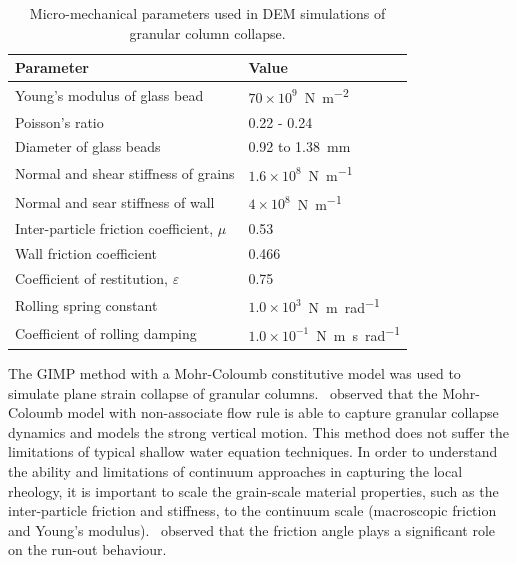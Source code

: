\begin{table}
\caption{Micro-mechanical parameters used in DEM simulations of granular column 
collapse.}
\label{table:DEM_data}
\centering
\begin{tabular}{ll}
\toprule
\textbf{Parameter} & \textbf{Value} \\ \midrule
Young's modulus of glass bead & 
$70\times10^{9}$~\si{\newton\per\m\squared}\\ 
Poisson's ratio & 0.22 - 0.24\\ 
Diameter of glass beads & 0.92 to 1.38~\si{\mm}\\
Normal and shear stiffness of grains & $1.6 \times 
10^{8}$~\si{\newton\per\m}\\ 
Normal and sear stiffness of wall & $4 \times 
10^{8}$~\si{\newton\per\m}\\
Inter-particle friction coefficient, $\mu$ & 0.53 \\
Wall friction coefficient & 0.466 \\ 
Coefficient of restitution, $\varepsilon$ & 0.75 \\ 
Rolling spring constant  & $1.0\times10^3$~\si{\newton\meter\per\radian}\\ 
Coefficient of rolling damping & $1.0 \times 
10^{-1}$~\si{\newton\meter\second\per\radian} \\ \bottomrule
\end{tabular}
\end{table}
The GIMP method with a Mohr-Coloumb constitutive model was used to simulate 
plane strain collapse of granular columns.~\citet{Crosta2009a} observed that 
the Mohr-Coloumb model with non-associate flow rule is able to capture granular 
collapse dynamics and models the strong vertical motion. This method does not 
suffer the limitations of typical shallow water equation techniques. In order 
to understand the ability and limitations of continuum approaches in capturing 
the local rheology, it is important to scale the grain-scale material 
properties, such as the inter-particle friction and stiffness, to the continuum 
scale (macroscopic friction and Young's modulus).~\citet{Crosta2009a} observed 
that the friction angle plays a significant role on the run-out behaviour. 

